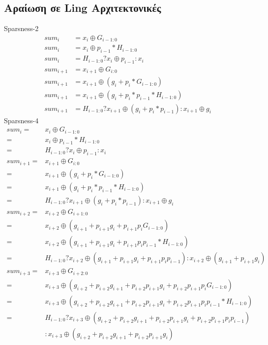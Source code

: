  \subsection{Αραίωση σε Ling Αρχιτεκτονικές}
Sparsness-2
\begin{equation*}
    \begin{split}
        sum_i &= x_i \oplus G_{i-1:0}\\
        sum_i &= x_i \oplus p_{i-1}*H_{i-1:0}\\
        sum_i &= H_{i-1:0} ? x_i \oplus p_{i-1} : x_i\\
        sum_{i+1} &= x_{i+1} \oplus G_{i:0}\\
        sum_{i+1} &= x_{i+1} \oplus (g_i + p_i*G_{i-1:0})\\
        sum_{i+1} &= x_{i+1} \oplus (g_i + p_i*p_{i-1}*H_{i-1:0})\\
        sum_{i+1} &= H_{i-1:0} ? x_{i+1} \oplus (g_i + p_i*p_{i-1}) : x_{i+1} \oplus g_i
    \end{split} 
\end{equation*}
Sparsness-4
\begin{equation*}
    \begin{split}
        sum_i =& x_i \oplus G_{i-1:0}\\
        =& x_i \oplus p_{i-1}*H_{i-1:0}\\
        =& H_{i-1:0} ? x_i \oplus p_{i-1} : x_i\\
        sum_{i+1} =& x_{i+1} \oplus G_{i:0}\\
        =& x_{i+1} \oplus (g_i + p_i*G_{i-1:0})\\
        =& x_{i+1} \oplus (g_i + p_i*p_{i-1}*H_{i-1:0})\\
        =& H_{i-1:0} ? x_{i+1} \oplus (g_i + p_i*p_{i-1}) : x_{i+1} \oplus g_i\\
        sum_{i+2} =& x_{i+2} \oplus G_{i+1:0}\\
        =& x_{i+2} \oplus (g_{i+1} + p_{i+1}g_i + p_{i+1}p_iG_{i-1:0})\\
        =& x_{i+2} \oplus (g_{i+1} + p_{i+1}g_i + p_{i+1}p_ip_{i-1}*H_{i-1:0})\\
        =& H_{i-1:0} ? x_{i+2} \oplus (g_{i+1} + p_{i+1}g_i + p_{i+1}p_ip_{i-1}) : x_{i+2} \oplus (g_{i+1} + p_{i+1}g_i)\\
        sum_{i+3} =& x_{i+3} \oplus G_{i+2:0}\\
        =& x_{i+3} \oplus (g_{i+2} + p_{i+2}g_{i+1} + p_{i+2}p_{i+1}g_i + p_{i+2}p_{i+1}p_iG_{i-1:0})\\
        =& x_{i+3} \oplus (g_{i+2} + p_{i+2}g_{i+1} + p_{i+2}p_{i+1}g_i + p_{i+2}p_{i+1}p_ip_{i-1}*H_{i-1:0})\\
        =& H_{i-1:0} ? x_{i+3} \oplus (g_{i+2} + p_{i+2}g_{i+1} + p_{i+2}p_{i+1}g_i + p_{i+2}p_{i+1}p_ip_{i-1}) \\&: x_{i+3} \oplus (g_{i+2} + p_{i+2}g_{i+1} + p_{i+2}p_{i+1}g_i)
    \end{split} 
\end{equation*}

 
 